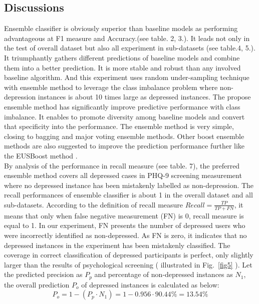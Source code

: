 \documentclass[10pt,journal,compsoc]{IEEEtran}
\begin{document}
\subsection{Discussions}
Ensemble classifier is obviously superior than baseline models as performing advantageous at F1 measure and Accuracy.(see table. 2, 3.). It leads not only in the test of overall dataset but also all experiment in sub-datasets (see table.4, 5.). It triumphantly gathers different predictions of baseline models and combine them into a better prediction. It is more stable and robust than any involved baseline algorithm. And this experiment uses random under-sampling technique with ensemble method to leverage the class imbalance problem where non-depression instances is about 10 times large as depressed instances. The propose ensemble method has significantly improve predictive performance with class imbalance. It enables to promote diversity among baseline models and convert that specificity into the performance. The ensemble method is very simple, closing to bagging and major voting ensemble methods. Other boost ensemble methods are also suggested to improve the prediction performance further like the EUSBoost method \cite{Sagi}. \\

By analysis of the performance in recall measure (see table. 7), the preferred ensemble method covers all depressed cases in PHQ-9 screening measurement where no depressed instance has been mistakenly labelled as non-depression. The recall performances of ensemble classifier is about 1 in the overall dataset and all sub-datasets. According to the definition of recall measure  $ Recall = \frac{TP}{TP + FN} $, it means that only when false negative measurement (FN) is 0, recall measure is equal to 1. In our experiment, FN presents the number of depressed users who were incorrectly identified as non-depressed. As FN is zero, it indicates that no depressed instances in the experiment has been mistakenly classified. The coverage in correct classification of depressed participants is perfect, only slightly larger than the results of psychological screening ( illustrated in Fig.~\ref{fig5} ). Let the predicted precision as $P_{p}$ and percentage of non-depressed instances as $N_{1}$, the overall prediction $P_{o}$ of depressed instances is calculated as below:\\
\begin{equation}\label{reio}
	P_{o} = 1 - (P_{p} \cdot N_{1})= 1 -  0.956 \cdot 90.44\% = 13.54\%
\end{equation}
\end{document}
